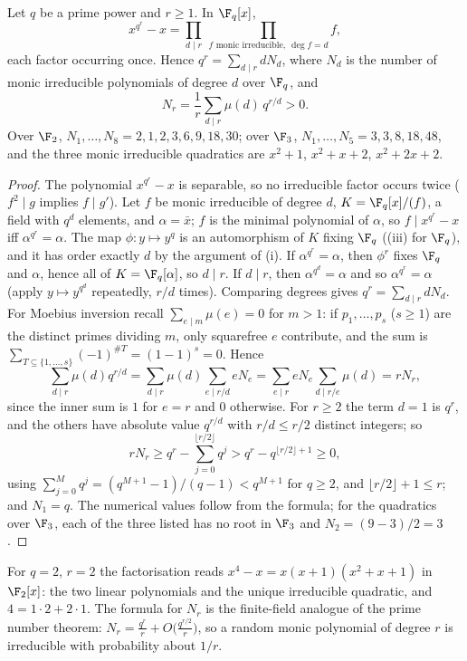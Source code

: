 \begin{proposition}\label{prop:rings:irreducible-count}
Let $q$ be a prime power and $r\ge1$. In $\F_q[x]$,
\[
x^{q^r}-x=\prod_{d\mid r}\ \prod_{f\text{ monic irreducible},\ \deg f=d}f,
\]
each factor occurring once. Hence $q^r=\sum_{d\mid r}dN_d$, where $N_d$ is the number of monic irreducible polynomials of degree $d$ over $\F_q$, and
\[
N_r=\frac1r\sum_{d\mid r}\mu(d)\,q^{r/d}>0 .
\]
Over $\F_2$, $N_1,\dots,N_8=2,1,2,3,6,9,18,30$; over $\F_3$, $N_1,\dots,N_5=3,3,8,18,48$, and the three monic irreducible quadratics are $x^2+1$,
$x^2+x+2$, $x^2+2x+2$.
\end{proposition}

\begin{proof}
The polynomial $x^{q^r}-x$ is separable, so no irreducible factor occurs twice ($f^2\mid g$ implies $f\mid g'$). Let $f$ be monic irreducible of
degree $d$, $K=\F_q[x]/(f)$, a field with $q^d$ elements, and $\alpha=\bar x$; $f$ is the minimal polynomial of $\alpha$, so $f\mid x^{q^r}-x$ iff $\alpha^{q^r}=\alpha$.
The map $\phi\colon y\mapsto y^q$ is an automorphism of $K$ fixing $\F_q$ ((iii) for $\F_q$), and it has order exactly $d$ by the
argument of (i). If $\alpha^{q^r}=\alpha$, then $\phi^r$ fixes $\F_q$ and $\alpha$, hence all of $K=\F_q[\alpha]$, so $d\mid r$. If $d\mid r$, then
$\alpha^{q^d}=\alpha$ and so $\alpha^{q^r}=\alpha$ (apply $y\mapsto y^{q^d}$ repeatedly, $r/d$ times). Comparing degrees gives $q^r=\sum_{d\mid r}dN_d$. For Moebius
inversion recall $\sum_{e\mid m}\mu(e)=0$ for $m>1$: if $p_1,\dots,p_s$ ($s\ge1$) are the distinct primes dividing $m$, only squarefree $e$ contribute, and
the sum is $\sum_{T\subseteq\{1,\dots,s\}}(-1)^{\#T}=(1-1)^s=0$. Hence
\[
\sum_{d\mid r}\mu(d)q^{r/d}=\sum_{d\mid r}\mu(d)\sum_{e\mid r/d}eN_e=\sum_{e\mid r}eN_e\sum_{d\mid r/e}\mu(d)=rN_r,
\]
since the inner sum is $1$ for $e=r$ and $0$ otherwise. For $r\ge2$ the term $d=1$ is $q^r$, and the others have absolute value $q^{r/d}$ with
$r/d\le r/2$ distinct integers; so
\[
rN_r\ge q^r-\sum_{j=0}^{\lfloor r/2\rfloor}q^j>q^r-q^{\lfloor r/2\rfloor+1}\ge0,
\]
using $\sum_{j=0}^{M}q^j=(q^{M+1}-1)/(q-1)<q^{M+1}$ for $q\ge2$, and $\lfloor r/2\rfloor+1\le r$; and $N_1=q$. The numerical values follow from the formula; for the
quadratics over $\F_3$, each of the three listed has no root in $\F_3$ and $N_2=(9-3)/2=3$.
\end{proof}

For $q=2$, $r=2$ the factorisation reads $x^4-x=x(x+1)(x^2+x+1)$ in $\F_2[x]$: the two linear polynomials and the unique irreducible quadratic, and
$4=1\cdot2+2\cdot1$. The formula for $N_r$ is the finite-field analogue of the prime number theorem: $N_r=\frac{q^r}r+O\bigl(\frac{q^{r/2}}r\bigr)$, so a random
monic polynomial of degree $r$ is irreducible with probability about $1/r$.

